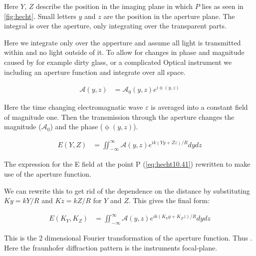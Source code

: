 Here $Y$, $Z$ describe the position in the imaging plane in which $P$ lies as seen in \autoref{fig:hecht}. Small letters $y$ and $z$ are the position in the aperture plane. The integral is over the aperture, only integrating over the transparent parts. 

Here we integrate only over the apperture and assume all light is transmitted within and no light outside of it. To allow for changes in phase and magnitude caused by for example dirty glass, or a complicated Optical instrument we including an aperture function and integrate over all space.

\begin{subequations}
  \begin{align}
    \mathscr{A}(y,z) &= \mathscr{A}_0 (y,z)e^{i\upphi(y,z)}
  \end{align}
\end{subequations}

Here the time changing electromagnatic wave $\varepsilon$ is averaged into a constant field of magnitude one. Then the transmission through the aperture changes the magnitude ($\mathscr{A}_0$) and the phase ($\upphi(y,z)$).

\begin{subequations}
  \begin{align}
    E(Y,Z) &= \iint_{-\infty}^{\infty} \mathscr{A}(y,z) e^{ik(Yy+Zz)/R} dydz
  \end{align}
\end{subequations}

The expression for the E field at the point P (\autoref{eq:hecht10.41}) rewritten to make use of the aperture function.

We can rewrite this to get rid of the dependence on the distance by substituting $Ky = kY/R$ and $Kz = kZ/R$ for $Y$ and $Z$. This gives the final form: 

\begin{subequations}
  \begin{align}
    E(K_Y,K_Z) &= \iint_{-\infty}^{\infty} \mathscr{A}(y,z) e^{ik(K_Yy+K_Zz)/R} dydz
  \end{align}
\end{subequations}

This is the 2 dimensional Fourier transformation of the aperture function. Thus  \cite{hecht}. Here the fraunhofer diffraction pattern is the instruments focal-plane.

